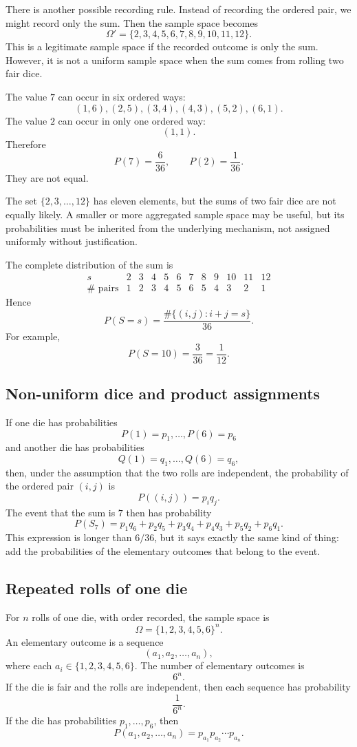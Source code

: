 There is another possible recording rule. Instead of recording the ordered pair,
we might record only the sum. Then the sample space becomes
\[
\Omega'=\{2,3,4,5,6,7,8,9,10,11,12\}.
\]
This is a legitimate sample space if the recorded outcome is only the sum.
However, it is not a uniform sample space when the sum comes from rolling two
fair dice.

The value \(7\) can occur in six ordered ways:
\[
(1,6),(2,5),(3,4),(4,3),(5,2),(6,1).
\]
The value \(2\) can occur in only one ordered way:
\[
(1,1).
\]
Therefore
\[
P(7)=\frac6{36},
\qquad
P(2)=\frac1{36}.
\]
They are not equal.

\begin{remarkbox}
The set \(\{2,3,\ldots,12\}\) has eleven elements, but the sums of two fair dice
are not equally likely. A smaller or more aggregated sample space may be useful,
but its probabilities must be inherited from the underlying mechanism, not
assigned uniformly without justification.
\end{remarkbox}

The complete distribution of the sum is
\[
\begin{array}{c|ccccccccccc}
s&2&3&4&5&6&7&8&9&10&11&12\\
\hline
\#\text{ pairs}&1&2&3&4&5&6&5&4&3&2&1
\end{array}
\]
Hence
\[
P(S=s)=\frac{\#\{(i,j):i+j=s\}}{36}.
\]
For example,
\[
P(S=10)=\frac3{36}=\frac1{12}.
\]

\subsection*{Non-uniform dice and product assignments}

If one die has probabilities
\[
P(1)=p_1,\ldots,P(6)=p_6
\]
and another die has probabilities
\[
Q(1)=q_1,\ldots,Q(6)=q_6,
\]
then, under the assumption that the two rolls are independent, the probability
of the ordered pair \((i,j)\) is
\[
P((i,j))=p_iq_j.
\]
The event that the sum is \(7\) then has probability
\[
P(S_7)=p_1q_6+p_2q_5+p_3q_4+p_4q_3+p_5q_2+p_6q_1.
\]
This expression is longer than \(6/36\), but it says exactly the same kind of
thing: add the probabilities of the elementary outcomes that belong to the
event.

\subsection*{Repeated rolls of one die}

For \(n\) rolls of one die, with order recorded, the sample space is
\[
\Omega=\{1,2,3,4,5,6\}^n.
\]
An elementary outcome is a sequence
\[
(a_1,a_2,\ldots,a_n),
\]
where each \(a_i\in\{1,2,3,4,5,6\}\). The number of elementary outcomes is
\[
6^n.
\]
If the die is fair and the rolls are independent, then each sequence has
probability
\[
\frac1{6^n}.
\]
If the die has probabilities \(p_1,\ldots,p_6\), then
\[
P(a_1,a_2,\ldots,a_n)=p_{a_1}p_{a_2}\cdots p_{a_n}.
\]


